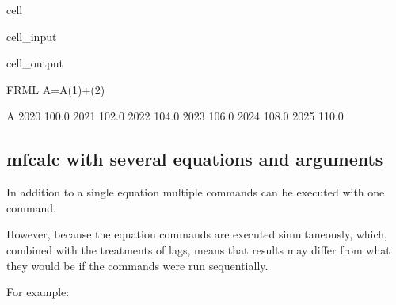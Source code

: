 \documentclass[letterpaper,10pt,english]{jupyterBook}
\begin{document}
\begin{sphinxuseclass}{cell}\begin{sphinxVerbatimInput}

\begin{sphinxuseclass}{cell_input}
\begin{sphinxVerbatim}[commandchars=\\\{\}]
\end{sphinxVerbatim}

\end{sphinxuseclass}\end{sphinxVerbatimInput}
\begin{sphinxVerbatimOutput}

\begin{sphinxuseclass}{cell_output}
\begin{sphinxVerbatim}[commandchars=\\\{\}]
FRML \PYGZlt{}\PYGZgt{} A=A(\PYGZhy{}1)+(2)\PYGZdl{}
\end{sphinxVerbatim}

\begin{sphinxVerbatim}[commandchars=\\\{\}]
          A
2020  100.0
2021  102.0
2022  104.0
2023  106.0
2024  108.0
2025  110.0
\end{sphinxVerbatim}

\end{sphinxuseclass}\end{sphinxVerbatimOutput}

\end{sphinxuseclass}

\subsection{mfcalc with several equations and arguments}
\label{\detokenize{content/04_PythonEssentials/mfcalc:mfcalc-with-several-equations-and-arguments}}
\sphinxAtStartPar
In addition to a single equation multiple commands can be executed with one command.

\sphinxAtStartPar
However,  because the equation commands are executed simultaneously, which, combined with the treatments of lags, means that results may differ from what they would be if the commands were run sequentially.

\sphinxAtStartPar
For example:
\end{document}
